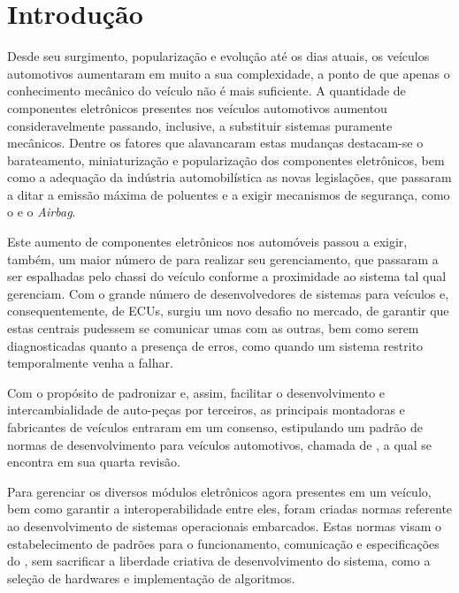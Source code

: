 \chapter{Introdução}

Desde seu surgimento, popularização e evolução até os dias atuais, os veículos automotivos aumentaram em muito a sua complexidade, a ponto de que apenas o conhecimento mecânico do veículo não é mais suficiente. A quantidade de componentes eletrônicos presentes nos veículos automotivos aumentou consideravelmente passando, inclusive, a substituir sistemas puramente mecânicos. Dentre os fatores que alavancaram estas mudanças destacam-se o barateamento, miniaturização e popularização dos componentes eletrônicos, bem como a adequação da indústria automobilística as novas legislações, que passaram a ditar a emissão máxima de poluentes e a exigir mecanismos de segurança, como o  e o \emph{Airbag}.

Este aumento de componentes eletrônicos nos automóveis passou a exigir, também, um maior número de  para realizar seu gerenciamento, que passaram a ser espalhadas pelo chassi do veículo conforme a proximidade ao sistema tal qual gerenciam. Com o grande número de desenvolvedores de sistemas para veículos e, consequentemente, de ECUs, surgiu um novo desafio no mercado, de garantir que estas centrais pudessem se comunicar umas com as outras, bem como serem diagnosticadas quanto a presença de erros, como quando um sistema restrito temporalmente venha a falhar.

Com o propósito de padronizar e, assim, facilitar o desenvolvimento e intercambialidade de auto-peças por terceiros, as principais montadoras e fabricantes de veículos entraram em um consenso, estipulando um padrão de normas de desenvolvimento para veículos automotivos, chamada de , a qual se encontra em sua quarta revisão.

Para gerenciar os diversos módulos eletrônicos agora presentes em um veículo, bem como garantir a interoperabilidade entre eles, foram criadas normas referente ao desenvolvimento de sistemas operacionais embarcados. Estas normas visam o estabelecimento de padrões para o funcionamento, comunicação e especificações do , sem sacrificar a liberdade criativa de desenvolvimento do sistema, como a seleção de hardwares e implementação de algoritmos.

